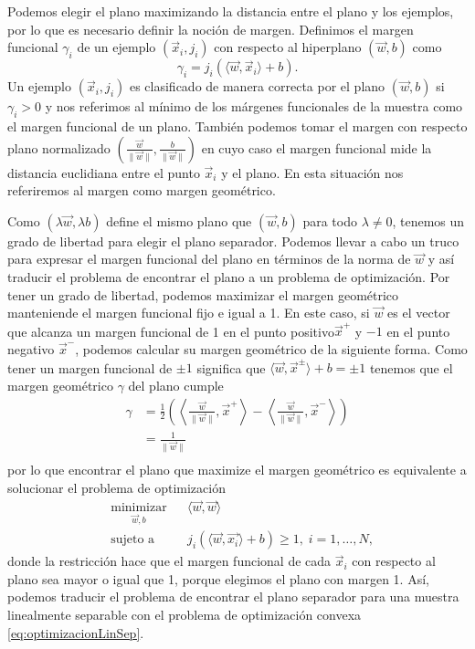 \documentclass[letterpaper,12pt]{book}
\begin{document}
Podemos elegir el plano maximizando la distancia entre el plano y los ejemplos, por lo que es necesario definir la noción de margen. Definimos el margen funcional $\gamma_i$ de un ejemplo $(\vec{x}_i, j_i)$ con respecto al hiperplano $(\vec{w}, b)$ como
\begin{equation}
\gamma_i = j_i(\langle\vec{w}, \vec{x}_i \rangle + b).
\end{equation}
Un ejemplo $(\vec{x}_i, j_i)$ es clasificado de manera correcta por el plano $(\vec{w}, b)$ si $\gamma_i>0$ y nos referimos al  mínimo de los márgenes funcionales de la muestra como el margen funcional de un plano. También podemos tomar el margen con respecto plano normalizado $(\frac{\vec{w}}{\|\vec{w}\|},\frac{b}{\|\vec{w}\|})$ en cuyo caso el margen funcional mide la distancia euclidiana entre el punto $\vec{x}_i$ y el plano. En esta situación nos referiremos al margen como  margen geométrico. 

Como $(\lambda\vec{w}, \lambda b)$ define el mismo plano que $(\vec{w}, b)$  para todo $\lambda \neq 0$, tenemos un grado de libertad para elegir el plano separador. Podemos llevar a cabo un truco para expresar el margen funcional del plano en términos de la norma de $\vec{w}$ y así traducir el problema de encontrar el plano a un problema de optimización. Por tener un grado de libertad,  podemos maximizar el margen geométrico manteniende el margen funcional fijo e igual a 1. En este caso, si $\vec{w}$ es el vector que alcanza un margen funcional de 1 en el punto  positivo$\vec{x}^+$ y $-1$ en el punto negativo $\vec{x}^-$, podemos calcular su margen geométrico de la siguiente forma. Como tener un margen funcional de $\pm 1$ significa que $\langle \vec{w}, \vec{x}^{\pm}\rangle +b = \pm 1$ tenemos que el margen geométrico $\gamma$ del plano cumple
\begin{equation}
  \begin{aligned}
    \gamma &=\frac{1}{2}\left(\left\langle\frac{\vec{w}}{\|\vec{w}\|},\vec{x}^+\right\rangle-\left\langle\frac{\vec{w}}{\|\vec{w}\|},\vec{x}^-\right\rangle\right) \\
    & = \frac{1}{\|\vec{w}\|}\\ 
  \end{aligned}
\end{equation}
por lo que encontrar el plano que maximize el margen geométrico es equivalente a solucionar el problema de optimización
\begin{equation}\label{eq:optimizacionLinSep}
\begin{aligned}
& \underset{\vec{w},b}{\text{minimizar}}
& & \langle \vec{w}, \vec{w} \rangle \\
& \text{sujeto a}
& & j_i(\langle \vec{w}, \vec{x_i}\rangle + b)\geq 1, \; i = 1, \ldots, N,
\end{aligned}
\end{equation}
donde la restricción hace que el margen funcional de cada $\vec{x}_i$ con respecto al plano sea mayor o igual que 1, porque elegimos el plano con margen 1. Así, podemos traducir el problema de encontrar el plano separador para una muestra linealmente separable con el problema de optimización convexa \ref{eq:optimizacionLinSep}.
\end{document}
